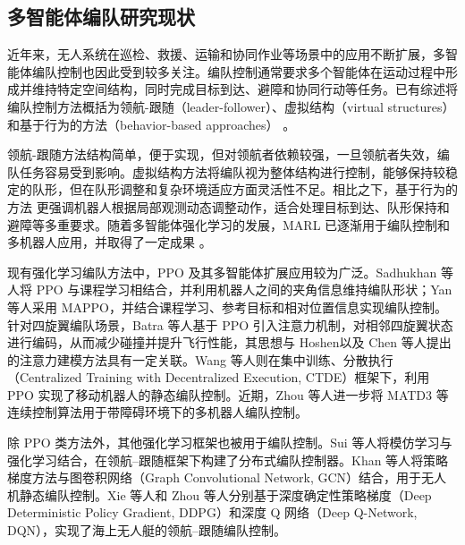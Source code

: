 \subsection{多智能体编队研究现状}

近年来，无人系统在巡检、救援、运输和协同作业等场景中的应用不断扩展，多智能体编队控制也因此受到较多关注。编队控制通常要求多个智能体在运动过程中形成并维持特定空间结构，同时完成目标到达、避障和协同行动等任务。已有综述将编队控制方法概括为领航-跟随（leader-follower）\cite{sui2020formation}、虚拟结构（virtual structures）\cite{yan2021formation} 和基于行为的方法（behavior-based approaches） \cite{liu2018survey,oh2015formation_survey}。

领航-跟随方法结构简单，便于实现，但对领航者依赖较强，一旦领航者失效，编队任务容易受到影响。虚拟结构方法将编队视为整体结构进行控制，能够保持较稳定的队形，但在队形调整和复杂环境适应方面灵活性不足。相比之下，基于行为的方法 \cite{xu2014behavior, quan2023robust} 更强调机器人根据局部观测动态调整动作，适合处理目标到达、队形保持和避障等多重要求。随着多智能体强化学习的发展，MARL 已逐渐用于编队控制和多机器人应用，并取得了一定成果 \cite{sui2020formation,yan2022relative,khan2020graph,orr2023marl_multirobot_survey}。

现有强化学习编队方法中，PPO 及其多智能体扩展应用较为广泛。Sadhukhan 等人\cite{sadhukhan2022proximal}将 PPO 与课程学习相结合，并利用机器人之间的夹角信息维持编队形状；Yan 等人\cite{yan2022relative}采用 MAPPO，并结合课程学习、参考目标和相对位置信息实现编队控制。针对四旋翼编队场景，Batra 等人\cite{batra2022decentralized}基于 PPO 引入注意力机制，对相邻四旋翼状态进行编码，从而减少碰撞并提升飞行性能，其思想与 Hoshen\cite{hoshen2017vain}以及 Chen 等人\cite{chen2019crowd}提出的注意力建模方法具有一定关联。Wang 等人\cite{wang2019pattern}则在集中训练、分散执行（Centralized Training with Decentralized Execution, CTDE）框架下，利用 PPO 实现了移动机器人的静态编队控制。近期，Zhou 等人\cite{zhou2023matd3_formation}进一步将 MATD3 等连续控制算法用于带障碍环境下的多机器人编队控制。

除 PPO 类方法外，其他强化学习框架也被用于编队控制。Sui 等人\cite{sui2020formation}将模仿学习与强化学习结合，在领航--跟随框架下构建了分布式编队控制器。Khan 等人\cite{khan2020graph}将策略梯度方法与图卷积网络（Graph Convolutional Network, GCN）结合，用于无人机静态编队控制。Xie 等人\cite{xie2021reinforcement}和 Zhou 等人\cite{zhou2019learn}分别基于深度确定性策略梯度（Deep Deterministic Policy Gradient, DDPG）和深度 Q 网络（Deep Q-Network, DQN），实现了海上无人艇的领航--跟随编队控制。

